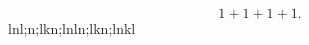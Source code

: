 \documentclass[a4paper]{article}
\title{}
\begin{document}
	\maketitle
\[
1+1+1+1
.\] 
lnl;n;lkn;lnln;lkn;lnkl
\end{document}
